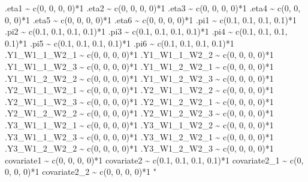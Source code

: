\documentclass[
]{book}
\newenvironment{Shaded}{\begin{snugshade}}{\end{snugshade}}
\newcommand{\StringTok}[1]{\textcolor[rgb]{0.31,0.60,0.02}{#1}}
\begin{document}
\begin{Shaded}
\begin{Highlighting}[]
\StringTok{.eta1 \textasciitilde{}}
\StringTok{    c(0, 0, 0, 0)*1}
\StringTok{.eta2 \textasciitilde{}}
\StringTok{    c(0, 0, 0, 0)*1}
\StringTok{.eta3 \textasciitilde{}}
\StringTok{    c(0, 0, 0, 0)*1}
\StringTok{.eta4 \textasciitilde{}}
\StringTok{    c(0, 0, 0, 0)*1}
\StringTok{.eta5 \textasciitilde{}}
\StringTok{    c(0, 0, 0, 0)*1}
\StringTok{.eta6 \textasciitilde{}}
\StringTok{    c(0, 0, 0, 0)*1}
\StringTok{.pi1 \textasciitilde{}}
\StringTok{    c(0.1, 0.1, 0.1, 0.1)*1}
\StringTok{.pi2 \textasciitilde{}}
\StringTok{    c(0.1, 0.1, 0.1, 0.1)*1}
\StringTok{.pi3 \textasciitilde{}}
\StringTok{    c(0.1, 0.1, 0.1, 0.1)*1}
\StringTok{.pi4 \textasciitilde{}}
\StringTok{    c(0.1, 0.1, 0.1, 0.1)*1}
\StringTok{.pi5 \textasciitilde{}}
\StringTok{    c(0.1, 0.1, 0.1, 0.1)*1}
\StringTok{.pi6 \textasciitilde{}}
\StringTok{    c(0.1, 0.1, 0.1, 0.1)*1}
\StringTok{.Y1\_W1\_1\_W2\_1 \textasciitilde{}}
\StringTok{    c(0, 0, 0, 0)*1}
\StringTok{.Y1\_W1\_1\_W2\_2 \textasciitilde{}}
\StringTok{    c(0, 0, 0, 0)*1}
\StringTok{.Y1\_W1\_1\_W2\_3 \textasciitilde{}}
\StringTok{    c(0, 0, 0, 0)*1}
\StringTok{.Y1\_W1\_2\_W2\_1 \textasciitilde{}}
\StringTok{    c(0, 0, 0, 0)*1}
\StringTok{.Y1\_W1\_2\_W2\_2 \textasciitilde{}}
\StringTok{    c(0, 0, 0, 0)*1}
\StringTok{.Y1\_W1\_2\_W2\_3 \textasciitilde{}}
\StringTok{    c(0, 0, 0, 0)*1}
\StringTok{.Y2\_W1\_1\_W2\_1 \textasciitilde{}}
\StringTok{    c(0, 0, 0, 0)*1}
\StringTok{.Y2\_W1\_1\_W2\_2 \textasciitilde{}}
\StringTok{    c(0, 0, 0, 0)*1}
\StringTok{.Y2\_W1\_1\_W2\_3 \textasciitilde{}}
\StringTok{    c(0, 0, 0, 0)*1}
\StringTok{.Y2\_W1\_2\_W2\_1 \textasciitilde{}}
\StringTok{    c(0, 0, 0, 0)*1}
\StringTok{.Y2\_W1\_2\_W2\_2 \textasciitilde{}}
\StringTok{    c(0, 0, 0, 0)*1}
\StringTok{.Y2\_W1\_2\_W2\_3 \textasciitilde{}}
\StringTok{    c(0, 0, 0, 0)*1}
\StringTok{.Y3\_W1\_1\_W2\_1 \textasciitilde{}}
\StringTok{    c(0, 0, 0, 0)*1}
\StringTok{.Y3\_W1\_1\_W2\_2 \textasciitilde{}}
\StringTok{    c(0, 0, 0, 0)*1}
\StringTok{.Y3\_W1\_1\_W2\_3 \textasciitilde{}}
\StringTok{    c(0, 0, 0, 0)*1}
\StringTok{.Y3\_W1\_2\_W2\_1 \textasciitilde{}}
\StringTok{    c(0, 0, 0, 0)*1}
\StringTok{.Y3\_W1\_2\_W2\_2 \textasciitilde{}}
\StringTok{    c(0, 0, 0, 0)*1}
\StringTok{.Y3\_W1\_2\_W2\_3 \textasciitilde{}}
\StringTok{    c(0, 0, 0, 0)*1}
\StringTok{covariate1 \textasciitilde{}}
\StringTok{    c(0, 0, 0, 0)*1}
\StringTok{covariate2 \textasciitilde{}}
\StringTok{    c(0.1, 0.1, 0.1, 0.1)*1}
\StringTok{covariate2\_1 \textasciitilde{}}
\StringTok{    c(0, 0, 0, 0)*1}
\StringTok{covariate2\_2 \textasciitilde{}}
\StringTok{    c(0, 0, 0, 0)*1}
\StringTok{"}


\end{Highlighting}
\end{Shaded}
\end{document}
